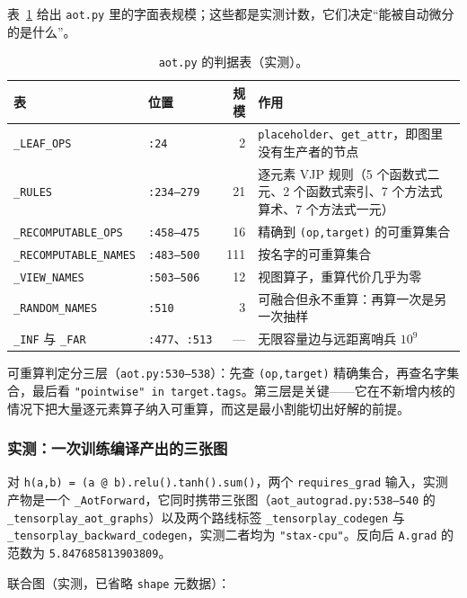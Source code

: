 表~\ref{tab:fe:aottables} 给出 \texttt{aot.py} 里的字面表规模；这些都是实测计数，它们决定“能被自动微分的是什么”。

\begin{table}[H]
\centering
\caption{\texttt{aot.py} 的判据表（实测）。}
\label{tab:fe:aottables}
\small
\begin{tabular}{llrl}
\toprule
表 & 位置 & 规模 & 作用 \\
\midrule
\texttt{\_LEAF\_OPS} & \texttt{:24} & 2 & \texttt{placeholder}、\texttt{get\_attr}，即图里没有生产者的节点 \\
\texttt{\_RULES} & \texttt{:234--279} & 21 & 逐元素 VJP 规则（5 个函数式二元、2 个函数式索引、7 个方法式算术、7 个方法式一元） \\
\texttt{\_RECOMPUTABLE\_OPS} & \texttt{:458--475} & 16 & 精确到 \texttt{(op,target)} 的可重算集合 \\
\texttt{\_RECOMPUTABLE\_NAMES} & \texttt{:483--500} & 111 & 按名字的可重算集合 \\
\texttt{\_VIEW\_NAMES} & \texttt{:503--506} & 12 & 视图算子，重算代价几乎为零 \\
\texttt{\_RANDOM\_NAMES} & \texttt{:510} & 3 & 可融合但永不重算：再算一次是另一次抽样 \\
\texttt{\_INF} 与 \texttt{\_FAR} & \texttt{:477}、\texttt{:513} & --- & 无限容量边与远距离哨兵 $10^{9}$ \\
\bottomrule
\end{tabular}
\end{table}

可重算判定分三层（\texttt{aot.py:530--538}）：先查 \texttt{(op,target)} 精确集合，再查名字集合，最后看 \texttt{"pointwise" in target.tags}。第三层是关键——它在不新增内核的情况下把大量逐元素算子纳入可重算，而这是最小割能切出好解的前提。

\subsubsection{实测：一次训练编译产出的三张图}

对 \texttt{h(a,b) = (a @ b).relu().tanh().sum()}，两个 \texttt{requires\_grad} 输入，实测产物是一个 \texttt{\_AotForward}，它同时携带三张图（\texttt{aot\_autograd.py:538--540} 的 \texttt{\_tensorplay\_aot\_graphs}）以及两个路线标签 \texttt{\_tensorplay\_codegen} 与 \texttt{\_tensorplay\_backward\_codegen}，实测二者均为 \texttt{"stax-cpu"}。反向后 \texttt{A.grad} 的范数为 \texttt{5.847685813903809}。

联合图（实测，已省略 \texttt{shape} 元数据）：

